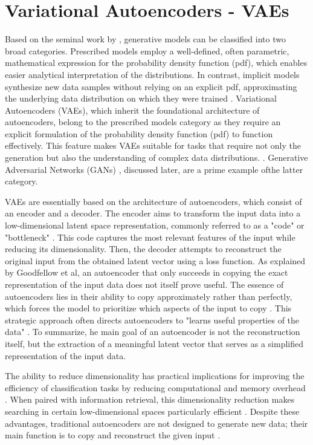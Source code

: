\section{Variational Autoencoders - VAEs}
\label{VAEs}

Based on the seminal work by \citeauthor{diggleImplicitPrescribed}, generative models can be classified into two broad categories. Prescribed models employ a well-defined, often parametric, mathematical expression for the probability density function (pdf), which enables easier analytical interpretation of the distributions. In contrast, implicit models synthesize new data samples without relying on an explicit pdf, approximating the underlying data distribution on which they were trained \citep{diggleImplicitPrescribed}. Variational Autoencoders (VAEs), which inherit the foundational architecture of autoencoders, belong to the prescribed models category as they require an explicit formulation of the probability density function (pdf) to function effectively. This feature makes VAEs suitable for tasks that require not only the generation but also the understanding of complex data distributions. \citep{kingmaVAE,rezendeVAE,GoodfellowDeepLearning}. Generative Adversarial Networks (GANs) \citep{goodfellowGAN}, discussed later, are a prime example ofthe latter category.

VAEs are essentially based on the architecture of autoencoders, which consist of an encoder and a decoder. The encoder aims to transform the input data into a low-dimensional latent space representation, commonly referred to as a "code" or "bottleneck" \citep{hintonCode, GoodfellowDeepLearning}. This code captures the most relevant features of the input while reducing its dimensionality. Then, the decoder attempts to reconstruct the original input from the obtained latent vector using a loss function. As explained by Goodfellow et al, an autoencoder that only succeeds in copying the exact representation of the input data does not itself prove useful. The essence of autoencoders lies in their ability to copy approximately rather than perfectly, which forces the model to prioritize which aspects of the input to copy \citep{GoodfellowDeepLearning}. This strategic approach often directs autoencoders to "learns useful properties of the data" \citep{GoodfellowDeepLearning}. To summarize, he main goal of an autoencoder is not the reconstruction itself, but the extraction of a meaningful latent vector that serves as a simplified representation of the input data.

The ability to reduce dimensionality has practical implications for improving the efficiency of classification tasks by reducing computational and memory overhead \citep{GoodfellowDeepLearning}. When paired with information retrieval, this dimensionality reduction makes searching in certain low-dimensional spaces particularly efficient \citep{GoodfellowDeepLearning}. Despite these advantages, traditional autoencoders are not designed to generate new data; their main function is to copy and reconstruct the given input \citep{GoodfellowDeepLearning}.

